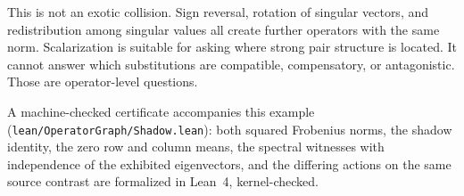 This is not an exotic collision.  Sign reversal, rotation of singular vectors, and redistribution
among singular values all create further operators with the same norm.  Scalarization is suitable
for asking where strong pair structure is located.  It cannot answer which substitutions are
compatible, compensatory, or antagonistic.  Those are operator-level questions.

A machine-checked certificate accompanies this example
(\texttt{lean/OperatorGraph/Shadow.lean}): both squared Frobenius norms, the
shadow identity, the zero row and column means, the spectral witnesses with
independence of the exhibited eigenvectors, and the differing actions on the
same source contrast are formalized in Lean~4, kernel-checked.

